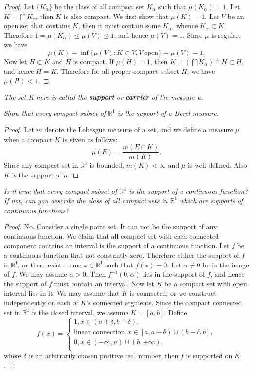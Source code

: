 \begin{proof}
Let $\{K_\alpha\}$ be the class of all compact set $K_\alpha$ such that $\mu(K_\alpha)=1$. Let $K=\bigcap K_\alpha$, then $K$ is also compact. We first show that $\mu(K)=1$. Let $V$ be an open set that contains $K$, then it must contain some $K_\alpha$, whence $K_\alpha\subset K$. Therefore $1=\mu(K_\alpha)\le\mu(V)\le 1$, and hence $\mu(V)=1$. Since $\mu$ is regular, we have 
$$\mu(K)=\inf\{\mu(V):K\subset V,V\ \text{open}\}=\mu(V)=1.$$
Now let $H\subset K$ and $H$ is compact. If $\mu(H)=1$, then $K=\left(\bigcap K_\alpha\right)\cap H\subset H$, and hence $H=K$. Therefore for all proper compact subset $H$, we have $\mu(H)<1$.
\end{proof}
\begin{note}\em
The set $K$ here is called the \textbf{support} or \textbf{carrier} of the measure $\mu$.
\end{note}
\begin{problem}\em
Show that every compact subset of $\mathbb{R}^1$ is the support of a Borel measure.
\end{problem}
\begin{proof}
Let $m$ denote the Lebesgue measure of a set, and we define a measure $\mu$ when a compact $K$ is given as follows:
$$\mu(E)=\frac{m(E\cap K)}{m(K)}.$$
Since any compact set in $\mathbb{R}^1$ is bounded, $m(K)<\infty$ and $\mu$ is well-defined. Also $K$ is the support of $\mu$.
\end{proof}
\begin{problem}\em
Is it true that every compact subset of $\mathbb{R}^1$ is the support of a continuous function? If not, can you describe the class of all compact sets in $\mathbb{R}^1$ which are supports of continuous functions?
\end{problem}
\begin{proof}
No. Consider a single point set. It can not be the support of any continuous function. We claim that all compact set with each connected component contains an interval is the support of a continuous function. Let $f$ be a continuous function that not constantly zero. Therefore either the support of $f$ is $\mathbb{R}^1$, or there exists some $x\in\mathbb{R}^1$ such that $f(x)=0$. Let $\alpha\ne 0$ be in the image of $f$. We may assume $\alpha>0$. Then $f^{-1}(0,\alpha)$ lies in the support of $f$, and hence the support of $f$ must contain an interval. Now let $K$ be a compact set with open interval lies in it. We may assume that $K$ is connected, or we construct independently on each of $K$'s connected segments. Since the compact connected set in $\mathbb{R}^1$ is the closed interval, we assume $K=[a,b]$. Define 
$$
f\left( x \right) =\begin{cases}
	1,x\in \left( a+\delta ,b-\delta \right) ,\\
	\text{linear connection},x\in \left[ a,a+\delta \right) \cup \left( b-\delta ,b \right] ,\\
	0,x\in \left( -\infty ,a \right) \cup \left( b,+\infty \right) ,\\
\end{cases}
$$
where $\delta$ is an arbitrarily chosen positive real number, then $f$ is supported on $K$.
\end{proof}
